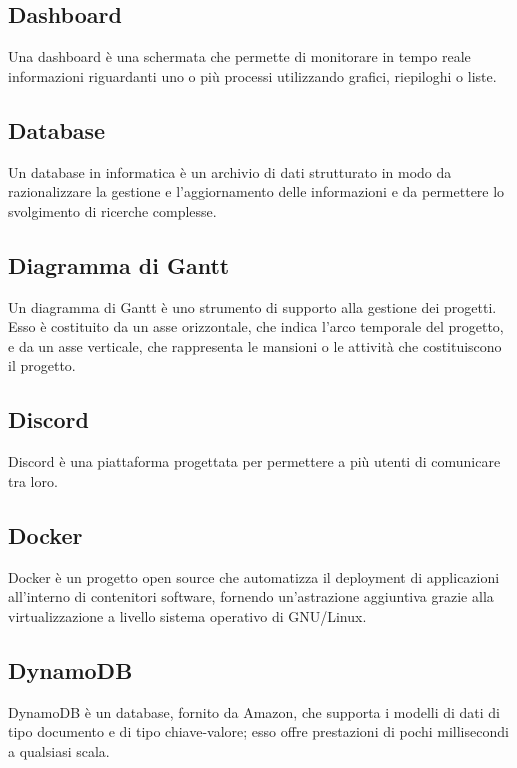 
\subsection*{Dashboard}
Una dashboard è una schermata che permette di monitorare in tempo reale informazioni riguardanti uno o più processi utilizzando grafici, riepiloghi o liste.

\subsection*{Database}
Un database in informatica è un archivio di dati strutturato in modo da razionalizzare la gestione e l'aggiornamento delle informazioni e da permettere lo svolgimento di ricerche complesse.

\subsection*{Diagramma di Gantt}
Un diagramma di Gantt è uno strumento di supporto alla gestione dei progetti. Esso è costituito da un asse orizzontale, che indica l'arco temporale del progetto, e da un asse verticale, che rappresenta le mansioni o le attività che costituiscono il progetto.

\subsection*{Discord}
Discord è una piattaforma progettata per permettere a più utenti di comunicare tra loro.

\subsection*{Docker}
Docker è un progetto open source che automatizza il deployment di applicazioni all'interno di contenitori software, fornendo un'astrazione aggiuntiva grazie alla virtualizzazione a livello sistema operativo di GNU/Linux.

\subsection*{DynamoDB}
DynamoDB è un database, fornito da Amazon, che supporta i modelli di dati di tipo documento e di tipo chiave-valore; esso offre prestazioni di pochi millisecondi a qualsiasi scala.


